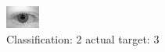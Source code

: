 \begin{figure}[h!]
\begin{center}
\includegraphics[width=0.60\columnwidth]{figures/ID598_class_2_target_3.png}
\end{center}
\caption{ Classification: 2 actual target: 3}
\label{fig:ID598_class_2_target_3}
\end{figure}
